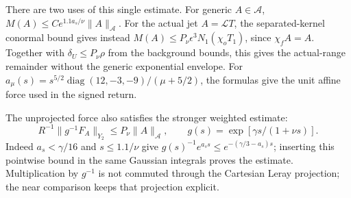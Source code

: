 There are two uses of this single estimate. For generic $A\in\mathscr A$,
$M(A)\le C e^{1.1a_s/\nu}\|A\|_{\mathscr A}$. For the actual jet
$A=\mathcal LT$, the separated-kernel conormal bound gives instead
$M(A)\le P_\nu\epsilon^3N_1(\chi_oT_1)$, since $\chi_f A=A$.
Together with $\delta_U\le P_\nu\rho$ from the background bounds,
this gives the actual-range remainder without the generic exponential
envelope. For $a_\mu(s)=s^{5/2}\operatorname{diag}(12,-3,-9)/(\mu+5/2)$,
the formulas give the unit affine force used in the signed return.

The unprojected force also satisfies the stronger weighted estimate:
\[
 R^{-1}\|g^{-1}F_A\|_{Y_2}\le P_\nu\|A\|_{\mathscr A},\qquad
 g(s)=\exp[\gamma s/(1+\nu s)].
\]
Indeed $a_s<\gamma/16$ and $s\le1.1/\nu$ give
$g(s)^{-1}e^{a_ss}\le e^{-(\gamma/3-a_s)s}$; inserting this
pointwise bound in the same Gaussian integrals proves the estimate.
Multiplication by $g^{-1}$ is not commuted through the Cartesian
Leray projection; the near comparison keeps that projection explicit.
